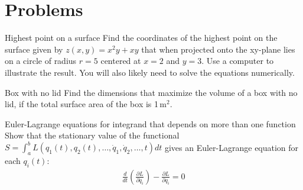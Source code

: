 %
\section{Problems}
\begin{problem}{Highest point on a surface} Find the coordinates of the highest point on the surface given by $z(x,y)=x^2y+xy$ that when projected onto the xy-plane lies on a circle of radius $r=5$ centered at $x=2$ and $y=3$. Use a computer to illustrate the result. You will also likely need to solve the equations numerically.
\label{prob_CalcVar_1}
\end{problem}
\begin{problem}{Box with no lid} Find the dimensions that maximize the volume of a box with no lid, if the total surface area of the box is 1\,m$^2$.
\label{prob_CalcVar_2}
\end{problem}
%
%
%

\begin{problem}{Euler-Lagrange equations for integrand that depends on more than one function}\label{prob_CalcVar_3} Show that the stationary value of the functional $S=\int_a^b L(q_1(t),q_2(t),\dots,\dot{q}_1, \dot{q}_2,\dots,t)dt$ gives an Euler-Lagrange equation for each $q_i(t)$:
\begin{align*}
\frac{d}{dt}\left(\frac{\partial L}{\partial \dot{q}_i}\right)-\frac{\partial L}{\partial q_i}=0
\end{align*}
\end{problem}

